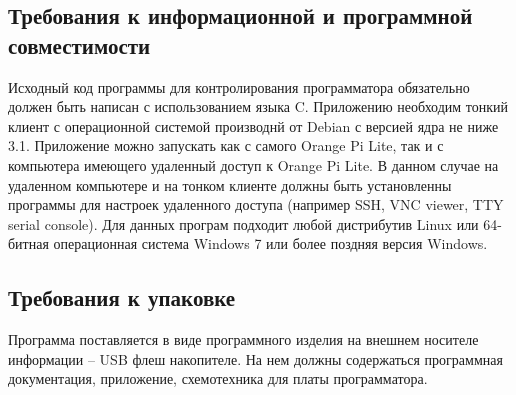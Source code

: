 \subsection{Требования к информационной и программной совместимости}
Исходный код программы для контролирования программатора обязательно должен быть написан с использованием языка C. Приложению необходим тонкий клиент с операционной системой производнй от Debian с версией ядра не ниже 3.1. Приложение можно запускать как с  самого Orange Pi Lite, так и с компьютера имеющего удаленный доступ к Orange Pi Lite. В данном случае на удаленном компьютере и на тонком клиенте должны быть установленны программы для настроек удаленного доступа (например SSH, VNC viewer, TTY serial console). Для данных програм подходит любой дистрибутив Linux или 64-битная операционная система Windows 7 или более поздняя версия Windows.


\subsection{Требования к упаковке}
Программа поставляется в виде программного изделия на внешнем носителе информации – USB флеш накопителе. На нем должны содержаться программная документация, приложение, схемотехника для платы программатора.
